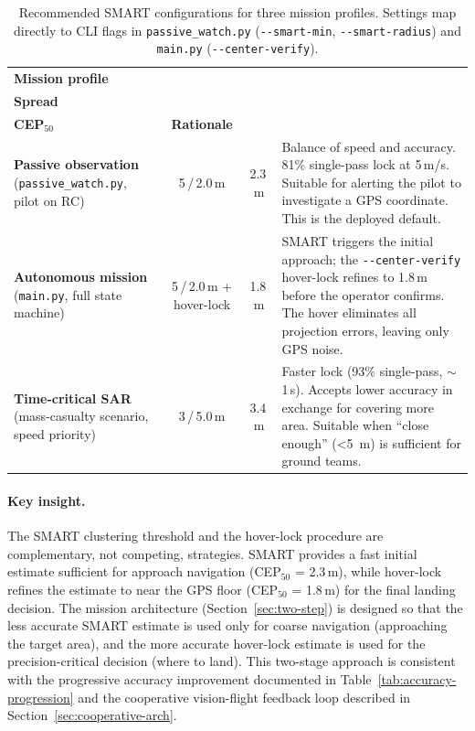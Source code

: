 \begin{table}[htbp]
  \centering
  \caption{Recommended SMART configurations for three mission profiles.  Settings map directly to CLI flags in \texttt{passive\_watch.py} (\texttt{-{}-smart-min}, \texttt{-{}-smart-radius}) and \texttt{main.py} (\texttt{-{}-center-verify}).}
  \label{tab:recommendations}
  \begin{tabular}{@{}p{3.5cm}ccp{6.5cm}@{}}
    \toprule
    \textbf{Mission profile} & \makecell{\textbf{Min /}\\\textbf{Spread}} & \makecell{\textbf{Expected}\\\textbf{CEP$_{50}$}} & \textbf{Rationale} \\
    \midrule
    \textbf{Passive observation} (\texttt{passive\_watch.py}, pilot on RC) & 5\,/\,2.0\,m & 2.3\,m & Balance of speed and accuracy.  81\% single-pass lock at 5\,m/s.  Suitable for alerting the pilot to investigate a GPS coordinate.  This is the deployed default. \\[0.5em]

    \textbf{Autonomous mission} (\texttt{main.py}, full state machine) & 5\,/\,2.0\,m + hover-lock & 1.8\,m & SMART triggers the initial approach; the \texttt{-{}-center-verify} hover-lock refines to 1.8\,m before the operator confirms.  The hover eliminates all projection errors, leaving only GPS noise. \\[0.5em]

    \textbf{Time-critical SAR} (mass-casualty scenario, speed priority) & 3\,/\,5.0\,m & 3.4\,m & Faster lock (93\% single-pass, $\sim$1\,s).  Accepts lower accuracy in exchange for covering more area.  Suitable when ``close enough'' (\SI{<5}{\metre}) is sufficient for ground teams. \\
    \bottomrule
  \end{tabular}
\end{table}

\paragraph{Key insight.}  The SMART clustering threshold and the hover-lock procedure are complementary, not competing, strategies.  SMART provides a fast initial estimate sufficient for approach navigation (CEP$_{50}$ = 2.3\,m), while hover-lock refines the estimate to near the GPS floor (CEP$_{50}$ = 1.8\,m) for the final landing decision.  The mission architecture (Section~\ref{sec:two-step}) is designed so that the less accurate SMART estimate is used only for coarse navigation (approaching the target area), and the more accurate hover-lock estimate is used for the precision-critical decision (where to land).  This two-stage approach is consistent with the progressive accuracy improvement documented in Table~\ref{tab:accuracy-progression} and the cooperative vision-flight feedback loop described in Section~\ref{sec:cooperative-arch}.

